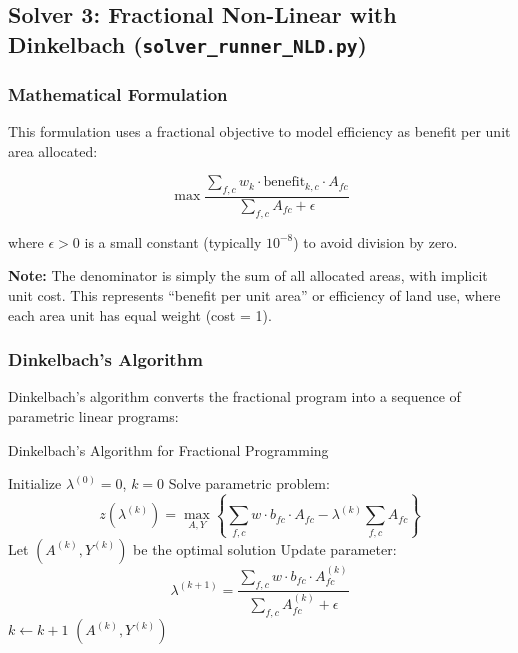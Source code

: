 \documentclass[11pt,a4paper]{article}
\begin{document}
\subsection{Solver 3: Fractional Non-Linear with Dinkelbach (\texttt{solver\_runner\_NLD.py})}

\subsubsection{Mathematical Formulation}

This formulation uses a fractional objective to model efficiency as benefit per unit area allocated:

\begin{equation}
\max \frac{\sum_{f,c} w_k \cdot \text{benefit}_{k,c} \cdot A_{fc}}{\sum_{f,c} A_{fc} + \epsilon}
\label{eq:fractional_obj}
\end{equation}

where $\epsilon > 0$ is a small constant (typically $10^{-8}$) to avoid division by zero.

\textbf{Note:} The denominator is simply the sum of all allocated areas, with implicit unit cost. This represents ``benefit per unit area'' or efficiency of land use, where each area unit has equal weight (cost = 1).

\subsubsection{Dinkelbach's Algorithm}

Dinkelbach's algorithm converts the fractional program into a sequence of parametric linear programs:

\begin{algorithm}[H]
\caption{Dinkelbach's Algorithm for Fractional Programming}
\begin{algorithmic}[1]
\State Initialize $\lambda^{(0)} = 0$, $k = 0$
\Repeat
    \State Solve parametric problem:
    \begin{equation*}
    z(\lambda^{(k)}) = \max_{A,Y} \left\{\sum_{f,c} w \cdot b_{fc} \cdot A_{fc} - \lambda^{(k)} \sum_{f,c} A_{fc}\right\}
    \end{equation*}
    \State Let $(A^{(k)}, Y^{(k)})$ be the optimal solution
    \State Update parameter:
    \begin{equation*}
    \lambda^{(k+1)} = \frac{\sum_{f,c} w \cdot b_{fc} \cdot A^{(k)}_{fc}}{\sum_{f,c} A^{(k)}_{fc} + \epsilon}
    \end{equation*}
    \State $k \leftarrow k + 1$
\State \Return $(A^{(k)}, Y^{(k)})$
\end{algorithmic}
\end{algorithm}
\end{document}
